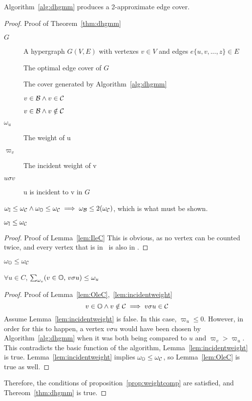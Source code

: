 

\begin{thm}
  Algorithm~\ref{alg:dhgmm} produces a 2-approximate edge cover.
  \label{thm:dhgmm}
\end{thm}
\begin{proof}{Proof of Theorem~\ref{thm:dhgmm}}
  \begin{dfn}
    \begin{description}
    \item[$G$] A hypergraph $G(V,E)$ with vertexes $v \in V$ and edges $e\{u,v,...,z\} \in E$
    \item[\cCd] The optimal edge cover of $G$
    \item[\cBd] The cover generated by Algorithm~\ref{alg:dhgmm}
    \item[\bId] $v \in {\mathcal B} \land v\in {\mathcal C}$
    \item[\bOd] $v \in {\mathcal B} \land v\notin {\mathcal C}$
    \item[$\omega_u$] The weight of u
    \item[$\varpi_v$] The incident weight of v
    \item[$ u \sigma v $] u is incident to v in $G$
    \end{description}
  \end{dfn}
  \begin{prop}
    $\omega_{{\mathbb I}} \le \omega_{{\mathcal C}} \land \omega_{{\mathbb O}} \le \omega_{{\mathcal C}} \implies \omega_{{\mathcal B}} \le 2(\omega_{{\mathcal C}})$, which is what must be shown.
    \label{prop:weightcomp}
  \end{prop}

  \begin{lem}
    $\omega_{{\mathbb I}} \le \omega_{{\mathcal C}}$
    \label{lem:IleC}
  \end{lem}
  \begin{proof}{Proof of Lemma~\ref{lem:IleC}}
    This is obvious, as no vertex can be counted twice, and every vertex that is in \bId\ is also in \cCd.
  \end{proof}
  \begin{lem}
    $\omega_{{\mathbb O}} \le \omega_{{\mathcal C}}$
    \label{lem:OleC}
  \end{lem}
  \begin{lem}
    $\forall u \in C$, $\sum_{\omega_v} (v \in {\mathbb O}\text{, }v \sigma u) \le \omega_u$
    \label{lem:incidentweight}
  \end{lem}
  \begin{proof}{Proof of Lemma~\ref{lem:OleC},~\ref{lem:incidentweight}}
    \begin{equation}
      v \in {\mathbb O} \land v \notin {\mathcal C} \implies v \sigma u \in {\mathcal C}
    \end{equation}
    Assume Lemma~\ref{lem:incidentweight} is false. In this case, $\varpi_u \le 0$. However, in order for this to happen, a vertex $v\sigma u$ would have been chosen by Algorithm~\ref{alg:dhgmm} when it was both being compared to $u$ and $\varpi_v > \varpi_u$. This contradicts the basic function of the algorithm, Lemma~\ref{lem:incidentweight} is true.
    Lemma~\ref{lem:incidentweight} implies $\omega_{{\mathbb O}} \le \omega_{{\mathcal C}}$, so Lemma~\ref{lem:OleC} is true as well.
  \end{proof}
        
  Therefore, the conditions of proposition~\ref{prop:weightcomp} are satisfied, and Thereom~\ref{thm:dhgmm} is true.
\end{proof}
